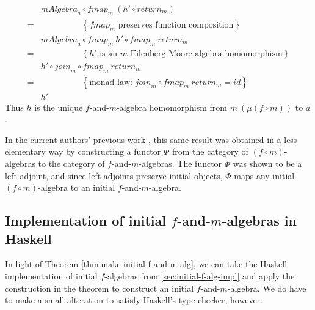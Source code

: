 \documentclass{jfp1}
\newcommand{\eqAnnotation}[1]{\hspace{2cm}\left\{\textrm{#1}\right\}}
\newcommand{\thmref}[1]{\hyperref[#1]{Theorem \ref*{#1}}}
\begin{document}
\begin{proof*}
\begin{enumerate}
\begin{displaymath}
\begin{array}{cl}
        &\mathit{mAlgebra}_a \circ \mathit{fmap}_m~(h' \circ \mathit{return}_m) \\
        =&\eqAnnotation{$\mathit{fmap}_m$ preserves function composition} \\
        &\mathit{mAlgebra}_a \circ \mathit{fmap}_m~{h'} \circ \mathit{fmap}_m~\mathit{return}_m \\
        =&\eqAnnotation{$h'$ is an $m$-Eilenberg-Moore-algebra homomorphism} \\
        &h' \circ \mathit{join}_m \circ \mathit{fmap}_m~\mathit{return}_m \\
        =&\eqAnnotation{monad law: $\mathit{join}_m \circ \mathit{fmap}_m~\mathit{return}_m = \mathit{id}$} \\
        &h'
      \end{array}
    \end{displaymath}
    Thus $h$ is the unique $f$-and-$m$-algebra homomorphism from
    $m~(\mu (f \circ m))$ to $a$. \mathproofbox
  \end{enumerate}
\end{proof*}

In the current authors' previous work \cite{atkey12fibrational}, this
same result was obtained in a less elementary way by constructing a
functor $\Phi$ from the category of $(f \circ m)$-algebras to the
category of $f$-and-$m$-algebras. The functor $\Phi$ was shown to be a
left adjoint, and since left adjoints preserve initial objects, $\Phi$
maps any initial $(f \circ m)$-algebra to an initial
$f$-and-$m$-algebra.


\subsection{Implementation of initial $f$-and-$m$-algebras in Haskell}
\label{sec:f-and-m-alg-impl}

\newcommand{\fcompose}{\mathop{\mathord:\circ\mathord:}}

In light of \thmref{thm:make-initial-f-and-m-alg}, we can take the
Haskell implementation of initial $f$-algebras from
\autoref{sec:initial-f-alg-impl} and apply the construction in the
theorem to construct an initial $f$-and-$m$-algebra. We do have to
make a small alteration to satisfy Haskell's type checker, however.
\end{document}
